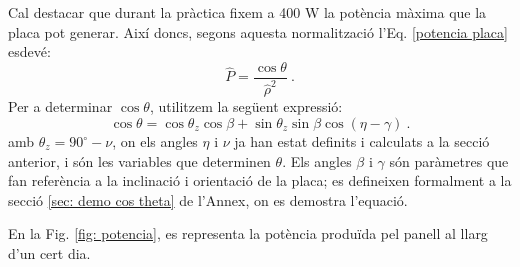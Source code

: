 \documentclass[11pt]{article}
\begin{document}
Cal destacar que durant la pràctica fixem a 400 W la potència màxima que la placa pot generar.
Així doncs, segons aquesta normalització l'Eq. \eqref{potencia placa} esdevé:
\begin{equation}
    \hat{P} = \frac{\cos{\theta}}{\hat{\rho}^2} \ .
    \label{pot norm}
\end{equation}
Per a determinar $\cos{\theta}$, utilitzem la següent expressió:
\begin{equation}
    \cos \theta = \cos \theta_z \cos \beta + \sin \theta_z \sin \beta \cos (\eta - \gamma) \ .
    \label{cos theta}
\end{equation}
amb $\theta_z = 90^{\circ}-\nu$, on els angles $\eta$ i $\nu$ ja han estat definits i calculats a la secció anterior, i són les variables que determinen $\theta$. Els angles $\beta$ i $\gamma$ són paràmetres que fan referència a la inclinació i orientació de la placa; es defineixen formalment a la secció \ref{sec: demo cos theta} de l'Annex, on es demostra l'equació.

En la Fig. \ref{fig: potencia}, es representa la potència produïda pel panell al llarg d'un cert dia.
\end{document}
